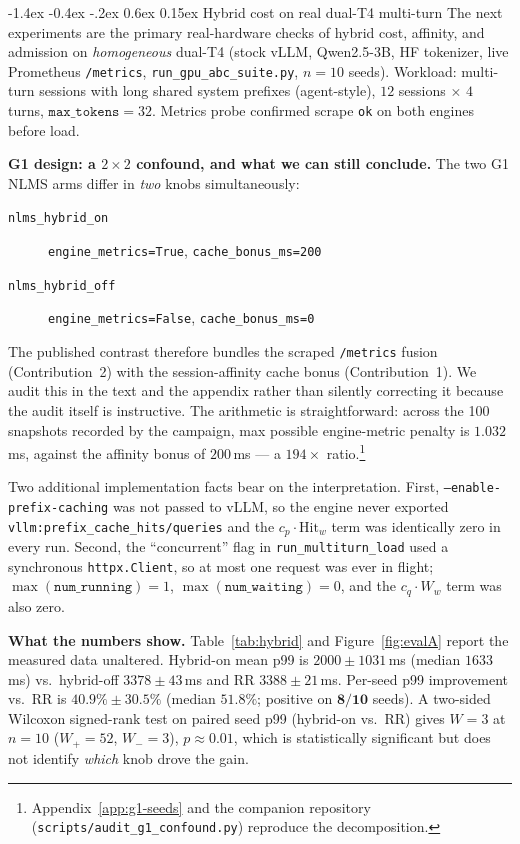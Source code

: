\documentclass[pdflatex,sn-mathphys-num]{sn-jnl}
\makeatletter
\renewcommand{\subsection}{\@startsection{subsection}{2}{\z@}%
  {-1.4ex \@plus -0.4ex \@minus -.2ex}%
  {0.6ex \@plus 0.15ex}%
  {\normalfont\normalsize\bfseries}}%
\makeatother
\begin{document}
\iffalse
\subsection{Hybrid cost on real dual-T4 multi-turn}
\label{sec:evalA}
The next experiments are the primary real-hardware checks of hybrid cost,
affinity, and admission on \emph{homogeneous} dual-T4 (stock vLLM, Qwen2.5-3B, HF
tokenizer, live Prometheus \texttt{/metrics}, \texttt{run\_gpu\_abc\_suite.py},
$n{=}10$ seeds). Workload: multi-turn sessions with long shared system prefixes
(agent-style), $12$ sessions $\times$ $4$ turns, $\texttt{max\_tokens}{=}32$. Metrics
probe confirmed scrape \texttt{ok} on both engines before load.

\textbf{G1 design: a $2\times2$ confound, and what we can still conclude.}
The two G1 NLMS arms differ in \emph{two} knobs simultaneously:
\begin{description}
\item[\texttt{nlms\_hybrid\_on}] \texttt{engine\_metrics=True}, \texttt{cache\_bonus\_ms=200}
\item[\texttt{nlms\_hybrid\_off}] \texttt{engine\_metrics=False}, \texttt{cache\_bonus\_ms=0}
\end{description}
The published contrast therefore bundles the scraped \texttt{/metrics} fusion
(Contribution~2) with the session-affinity cache bonus (Contribution~1).
We audit this in the text and the appendix rather than silently correcting it
because the audit itself is instructive. The arithmetic is straightforward:
across the 100 snapshots recorded by the campaign, max possible engine-metric
penalty is $1.032$\,ms, against the affinity bonus of $200$\,ms --- a $194{\times}$
ratio.\footnote{Appendix~\ref{app:g1-seeds} and the companion repository
(\texttt{scripts/audit\_g1\_confound.py}) reproduce the decomposition.}

Two additional implementation facts bear on the interpretation. First, \texttt{--enable-prefix-caching} was not passed to vLLM, so the engine never exported
\texttt{vllm:prefix\_cache\_hits/queries} and the $c_p{\cdot}\text{Hit}_w$ term was
identically zero in every run. Second, the ``concurrent'' flag in
\texttt{run\_multiturn\_load} used a synchronous \texttt{httpx.Client}, so at most
one request was ever in flight; $\max(\texttt{num\_running}){=}1$,
$\max(\texttt{num\_waiting}){=}0$, and the $c_q{\cdot}W_w$ term was also zero.

\textbf{What the numbers show.}
Table~\ref{tab:hybrid} and Figure~\ref{fig:evalA} report the measured data unaltered.
Hybrid-on mean p99 is $2000\pm1031$\,ms (median $1633$\,ms) vs.\ hybrid-off
$3378\pm43$\,ms and RR $3388\pm21$\,ms. Per-seed p99 improvement vs.\ RR is
$\mathbf{40.9\%\pm30.5\%}$ (median $\mathbf{51.8\%}$; positive on $\mathbf{8/10}$
seeds). A two-sided Wilcoxon signed-rank test on paired seed p99 (hybrid-on vs.\ RR)
gives $W{=}3$ at $n{=}10$ ($W_+{=}52$, $W_-{=}3$), $p{\approx}0.01$, which is
statistically significant but does not identify \emph{which} knob drove the gain.
\end{document}
